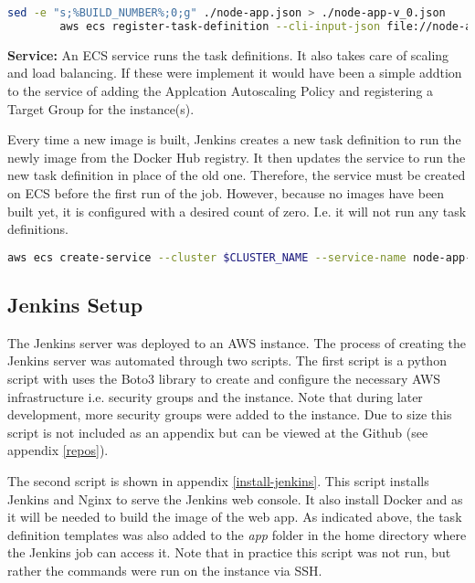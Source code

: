 	\begin{minipage}{\textwidth}
		\begin{lstlisting}[caption={Register Task Definition},language=bash]
		sed -e "s;%BUILD_NUMBER%;0;g" ./node-app.json > ./node-app-v_0.json
		aws ecs register-task-definition --cli-input-json file://node-app-v_0.json	
		\end{lstlisting}
	\end{minipage}
	
	\noindent \textbf{Service:} An ECS service runs the task definitions. It also takes care of scaling and load balancing. If these were implement it would have been a simple addtion to the service of adding the Applcation Autoscaling Policy and registering a Target Group for the instance(s).
	
	Every time a new image is built, Jenkins creates a new task definition to run the newly image from the Docker Hub registry. It then updates the service to run the new task definition in place of the old one. Therefore, the service must be created on ECS before the first run of the job. However, because no images have been built yet, it is configured with a desired count of zero. I.e. it will not run any task definitions.
	
	\begin{minipage}{\textwidth}
		\begin{lstlisting}[caption={Create Service},language=bash]
		aws ecs create-service --cluster $CLUSTER_NAME --service-name node-app-service --task-definition node-app --desired-count 0
		\end{lstlisting}
	\end{minipage}
		
	\subsection{Jenkins Setup}
	The Jenkins server was deployed to an AWS instance. The process of creating the Jenkins server was automated through two scripts. The first script is a python script with uses the Boto3 library to create and configure the necessary AWS infrastructure i.e. security groups and the instance. Note that during later development, more security groups were added to the instance. Due to size this script is not included as an appendix but can be viewed at the Github (see appendix \autoref{repos}).
	
	The second script is shown in appendix \autoref{install-jenkins}. This script installs Jenkins and Nginx to serve the Jenkins web console. It also install Docker and as it will be needed to build the image of the web app. As indicated above, the task definition templates was also added to the \textit{app} folder in the home directory where the Jenkins job can access it. Note that in practice this script was not run, but rather the commands were run on the instance via SSH.


